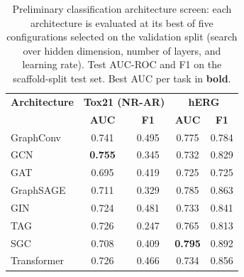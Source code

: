 \documentclass[journal,onecolumn]{IEEEtran}
\begin{document}
\begin{table}[H]
\centering
\caption{Preliminary classification architecture screen: each architecture is evaluated at its best of five configurations selected on the validation split (search over hidden dimension, number of layers, and learning rate). Test AUC-ROC and F1 on the scaffold-split test set. Best AUC per task in \textbf{bold}.}
\label{tab:arch_classification}
\small
\setlength{\tabcolsep}{4pt}
\begin{tabular}{lcccc}
\toprule
\textbf{Architecture} & \multicolumn{2}{c}{\textbf{Tox21 (NR-AR)}} & \multicolumn{2}{c}{\textbf{hERG}} \\
 & \textbf{AUC} & \textbf{F1} & \textbf{AUC} & \textbf{F1} \\
\midrule
GraphConv & 0.741 & 0.495 & 0.775 & 0.784 \\
GCN & \textbf{0.755} & 0.345 & 0.732 & 0.829 \\
GAT & 0.695 & 0.419 & 0.725 & 0.725 \\
GraphSAGE & 0.711 & 0.329 & 0.785 & 0.863 \\
GIN & 0.724 & 0.481 & 0.733 & 0.841 \\
TAG & 0.726 & 0.247 & 0.765 & 0.813 \\
SGC & 0.708 & 0.409 & \textbf{0.795} & 0.892 \\
Transformer & 0.726 & 0.466 & 0.734 & 0.856 \\
\bottomrule
\end{tabular}
\end{table}
\end{document}
